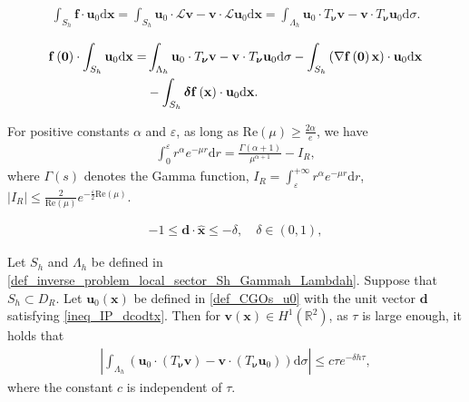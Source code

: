 \documentclass[10pt,a4paper]{amsart}
\begin{document}
\begin{align} \label{eq_fu0=u0Tnuv_original}
	\int_{S_h} \mathbf{f} \cdot \mathbf{u}_0 \mathrm{d}\mathbf{x} = \int_{S_h} \mathbf{u}_0 \cdot \mathcal{L} \mathbf{v} - \mathbf{v} \cdot \mathcal{L} \mathbf{u}_0 \mathrm{d}\mathbf{x} = \int_{\Lambda_h} \mathbf{u}_0 \cdot T_{\bm{\nu}} \mathbf{v} - \mathbf{v} \cdot T_{\bm{\nu}} \mathbf{u}_0 \mathrm{d}\sigma.
\end{align}

\begin{align} \label{eq_IP_fexpansion_Bettiformula}
	\mathbf{f} \left(\bm{0}\right) \cdot \int_{S_h} \mathbf{u}_0 \mathrm{d}\mathbf{x} = & \int_{\Lambda_h} \mathbf{u}_0 \cdot T_{\bm{\nu}} \mathbf{v} - \mathbf{v} \cdot T_{\bm{\nu}} \mathbf{u}_0 \mathrm{d}\sigma - \int_{S_h} \left( \nabla \mathbf{f} \left(\bm{0}\right) \mathbf{x} \right) \cdot \mathbf{u}_0 \mathrm{d}\mathbf{x} \notag \\
	& - \int_{S_h} \bm{\delta} \mathbf{f} \left(\mathbf{x}\right) \cdot \mathbf{u}_0 \mathrm{d}\mathbf{x}.
\end{align}

\begin{proposition} \label{prop_inverse_problem_integral_re}
	For positive constants $ \alpha $ and $ \varepsilon $, as long as $ \mathrm{Re}  \left(\mu\right) \geqslant \frac{2\alpha}{e} $, we have
	\begin{align*} 
		\int_{0}^{\varepsilon} r^\alpha e^{- \mu r} \mathrm{d}r = \frac{\Gamma \left( \alpha + 1 \right)}{\mu^{\alpha + 1}} - I_R,
	\end{align*}
	where $ \Gamma \left(s\right)$ denotes the Gamma function, $ I_R = \int_{\varepsilon}^{+\infty} r^\alpha e^{-\mu r} \mathrm{d}r $, $ \left| I_R \right| \leqslant \frac{2}{\mathrm{Re}\left(\mu\right)} e^{ - \frac{\varepsilon}{2} \mathrm{Re} \left(\mu\right)} $. 
\end{proposition}

\begin{align} \label{ineq_IP_dcodtx}
	-1 \leqslant \mathbf{d} \cdot \hat{\mathbf{x}} \leqslant - \delta ,\quad \delta \in \left(0,1\right),
\end{align}

\begin{lemma} \label{lem_IP_est_int_Lamdah_u0Tv-vTu0} 
	Let $ S_h $ and $ \Lambda_h $ be defined in \eqref{def_inverse_problem_local_sector_Sh_Gammah_Lambdah}. Suppose that $ S_h\subset D_R $. Let $ \mathbf{u}_0\left(\mathbf{x}\right) $ be defined in \eqref{def_CGOs_u0} with the unit vector $ \mathbf{d} $ satisfying \eqref{ineq_IP_dcodtx}. Then for $ \mathbf{v}\left(\mathbf{x}\right) \in H^1\left(\mathbb{R}^2\right) $, as $ \tau $ is large enough, it holds that
	\begin{align} \label{est_IP_int_Lamdah_u0Tv-vTu0} 
		\left| \int_{\Lambda_h} \left(\mathbf{u}_0 \cdot \left( T_{\bm{\nu}} \mathbf{v} \right) - \mathbf{v} \cdot \left(T_{\bm{\nu}} \mathbf{u}_0\right)\right) \mathrm{d}\sigma \right| \leqslant c\tau e^{- \delta h \tau},
	\end{align}  
	where the constant $ c $ is independent of $ \tau $.
\end{lemma}
\end{document}
